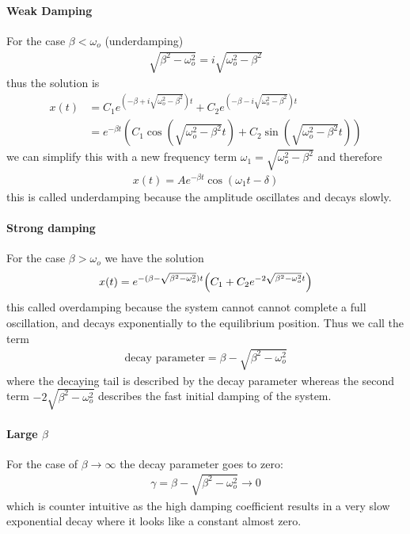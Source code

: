 \documentclass[../main.tex]{subfiles}
\begin{document}
\paragraph*{Weak Damping}
For the case $\beta < \omega_o$ (underdamping)
\begin{align*}
    \sqrt{\beta^2 - \omega_o^2} = i \sqrt{\omega_o^2 - \beta^2}
\end{align*}
thus the solution is
\begin{align*}
    x(t) &= C_1 e^{(-\beta + i \sqrt{\omega_o^2 - \beta^2}) t} + C_2 e^{(-\beta - i \sqrt{\omega_o^2 - \beta^2}) t} \\
    &= e^{-\beta t} (C_1 \cos(\sqrt{\omega_o^2 - \beta^2} t) + C_2 \sin(\sqrt{\omega_o^2 - \beta^2} t))
\end{align*}
we can simplify this with a new frequency term $\omega_1 = \sqrt{\omega_o^2 - \beta^2}$ and
therefore
\begin{align*}
    x(t) = A e^{-\beta t} \cos(\omega_1 t - \delta)
\end{align*}
this is called underdamping because the amplitude oscillates and decays slowly. 

\paragraph*{Strong damping}
For the case $\beta > \omega_o$ we have the solution
\begin{align*}
    x(t) = e^{-(\beta - \sqrt{\beta^2 - \omega_o^2})t} \qt(C_1 + C_2 e^{-2\sqrt{\beta^2 - \omega_o^2} t})
\end{align*}
this called overdamping because the system cannot cannot complete a full oscillation, and decays
exponentially to the equilibrium position. Thus we call the term
\begin{align*}
    \textrm{decay parameter} = \beta - \sqrt{\beta^2 - \omega_o^2}
\end{align*}
where the decaying tail is described by the decay parameter whereas the second term
$-2\sqrt{\beta^2 - \omega_o^2}$ describes the fast initial damping of the system.

\paragraph*{Large $\beta$} For the case of $\beta \to \infty$ the decay parameter goes to zero:
\begin{align*}
    \gamma = \beta - \sqrt{\beta^2 - \omega_o^2} \to 0
\end{align*}
which is counter intuitive as the high damping coefficient results in a very slow exponential decay
where it looks like a constant almost zero.
\end{document}
